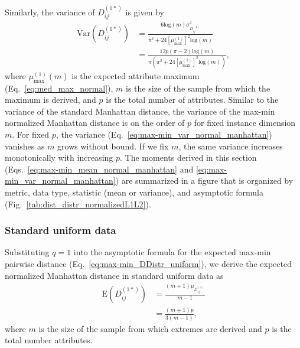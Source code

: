 \documentclass[10pt,letterpaper]{article}
\begin{document}
Similarly, the variance of $D^{(1*)}_{ij}$ is given by
%
\begin{equation}\label{eq:max-min_var_normal_manhattan}
\begin{aligned}
\text{Var}\left(D^{(1*)}_{ij}\right) &= \frac{6\text{log}(m)\sigma^2_{D^{(1)}_{ij}}}{\pi^2 + 24\left[\mu^{(1)}_\text{max}\right]^2\text{log}(m)} \\
&= \frac{12p(\pi-2)\text{log}(m)}{\pi\left(\pi^2 + 24\left[\mu^{(1)}_\text{max}\right]^2\text{log}(m)\right)},
\end{aligned}
\end{equation}
%
where $\mu^{(1)}_\text{max}(m)$ is the expected attribute maximum (Eq.~\ref{eq:med_max_normal}), $m$ is the size of the sample from which the maximum is derived, and $p$ is the total number of attributes. Similar to the variance of the standard Manhattan distance, the variance of the max-min normalized Manhattan distance is on the order of $p$ for fixed instance dimension $m$. For fixed $p$, the variance (Eq.~\ref{eq:max-min_var_normal_manhattan}) vanishes as $m$ grows without bound. If we fix $m$, the same variance increases monotonically with increasing $p$. The moments derived in this section (Eqs.~\ref{eq:max-min_mean_normal_manhattan} and \ref{eq:max-min_var_normal_manhattan}) are summarized in a figure that is organized by metric, data type, statistic (mean or variance), and asymptotic formula (Fig.~\ref{tab:dist_distr_normalizedL1L2}).

\subsubsection*{Standard uniform data}

Substituting $q=1$ into the asymptotic formula for the expected max-min pairwise distance (Eq.~\ref{eq:max-min_DDistr_uniform}), we derive the expected normalized Manhattan distance in standard uniform data as
%
\begin{equation}\label{eq:max-min_mean_uniform_manhattan}
\begin{aligned}
\text{E}\left(D^{(1*)}_{ij}\right) &= \frac{(m+1)\mu_{D^{(1)}_{ij}}}{m-1} \\
&= \frac{(m+1)p}{3(m-1)},
\end{aligned}
\end{equation}
%
where $m$ is the size of the sample from which extremes are derived and $p$ is the total number attributes.
\end{document}
